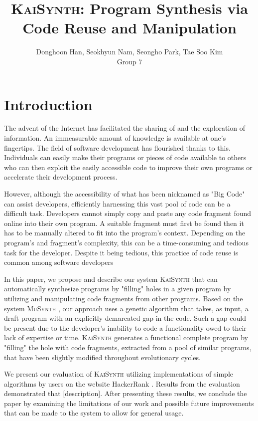 \documentclass{article}
\title{\textsc{KaiSynth}: Program Synthesis via Code Reuse and Manipulation}
\author{Donghoon Han, Seokhyun Nam, Seongho Park, Tae Soo Kim\\Group 7}
\begin{document}
\maketitle

\section{Introduction}
The advent of the Internet has facilitated the sharing of and the exploration of information. An immeasurable amount of knowledge is available at one's fingertips. The field of software development has flourished thanks to this. Individuals can easily make their programs or pieces of code available to others who can then exploit the easily accessible code to improve their own programs or accelerate their development process.

However, although the accessibility of what has been nicknamed as "Big Code" can assist developers, efficiently harnessing this vast pool of code can be a difficult task. Developers cannot simply copy and paste any code fragment found online into their own program. A suitable fragment must first be found then it has to be manually altered to fit into the program's context. Depending on the program's and fragment's complexity, this can be a time-consuming and tedious task for the developer. Despite it being tedious, this practice of code reuse is common among software developers 

In this paper, we propose and describe our system \textsc{KaiSynth} that can automatically synthesize programs by "filling" holes in a given program by utilizing and manipulating code fragments from other programs. Based on the system \textsc{MuSynth} \cite{musynth}, our approach uses a genetic algorithm that takes, as input, a draft program with an explicitly demarcated gap in the code. Such a gap could be present due to the developer's inability to code a functionality owed to their lack of expertise or time. \textsc{KaiSynth} generates a functional complete program by "filling" the hole with code fragments, extracted from a pool of similar programs, that have been slightly modified throughout evolutionary cycles. 

We present our evaluation of \textsc{KaiSynth} utilizing implementations of simple algorithms by users on the website HackerRank \cite{hackerrank}. Results from the evaluation demonstrated that [description]. After presenting these results, we conclude the paper by examining the limitations of our work and possible future improvements that can be made to the system to allow for general usage.
\end{document}
